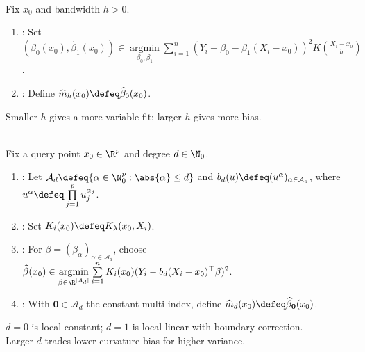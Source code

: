\begin{method} \label{meth:local-linear-regression-smoothing} \\
Fix $x_0$ and bandwidth $h>0$.
\begin{enumerate}[label=(\roman*)]
\setlength{\itemsep}{0pt}
\item {}: Set $(\widehat{\beta}_0(x_0),\widehat{\beta}_1(x_0))\in\operatorname*{argmin}\limits_{\beta_0,\beta_1}\sum\limits_{i=1}^n(Y_i-\beta_0-\beta_1(X_i-x_0))^2K(\frac{X_i-x_0}{h})$.
\item {}: Define $\widehat{m}_h(x_0)\defeq\widehat{\beta}_0(x_0)$.
\end{enumerate}
Smaller $h$ gives a more variable fit; larger $h$ gives more bias.
\end{method}

\begin{method} \label{meth:local-polynomial-regression-smoothing} \\
Fix a query point $x_0\in\R^p$ and degree $d\in\N_0$.
\begin{enumerate}[label=(\roman*)]
\setlength{\itemsep}{0pt}
\item {}: Let $\mathcal{A}_d\defeq\{\alpha\in\N_0^p:\abs{\alpha}\leq d\}$ and $b_d(u)\defeq(u^\alpha)_{\alpha\in\mathcal{A}_d}$, where $u^\alpha\defeq\prod\limits_{j=1}^pu_j^{\alpha_j}$.
\item {}: Set $K_i(x_0)\defeq K_\lambda(x_0,X_i)$.
\item {}: For $\beta=(\beta_\alpha)_{\alpha\in\mathcal{A}_d}$, choose $\widehat{\beta}(x_0)\in\operatorname*{argmin}\limits_{\beta\in\R^{|\mathcal{A}_d|}}\sum\limits_{i=1}^nK_i(x_0)(Y_i-b_d(X_i-x_0)^\top\beta)^2$.
\item {}: With $\mathbf{0}\in\mathcal{A}_d$ the constant multi-index, define $\widehat{m}_d(x_0)\defeq\widehat{\beta}_{\mathbf{0}}(x_0)$.
\end{enumerate}
$d=0$ is local constant; $d=1$ is local linear with boundary correction.\\
Larger $d$ trades lower curvature bias for higher variance.
\end{method}


